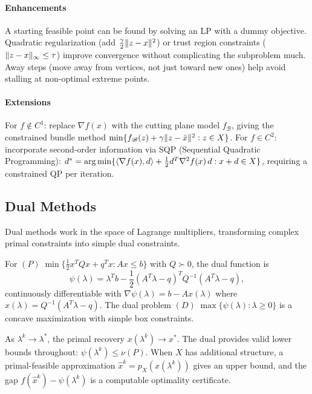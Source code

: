 \paragraph{Enhancements}

A starting feasible point can be found by solving an LP with a dummy objective.
Quadratic regularization (add $\frac{\gamma}{2}\lVert z - x\rVert^2$) or trust region constraints ($\lVert z - x\rVert_\infty \leq \tau$) improve convergence without complicating the subproblem much.
Away steps (move away from vertices, not just toward new ones) help avoid stalling at non-optimal extreme points.

\paragraph{Extensions}

For $f \notin C^1$: replace $\nabla f(x)$ with the cutting plane model $f_{\mathcal{B}}$, giving the constrained bundle method $\min\{f_{\mathcal{B}}(z) + \gamma\lVert z - \bar{x}\rVert^2 : z \in X\}$.
For $f \in C^2$: incorporate second-order information via SQP (Sequential Quadratic Programming): $d^* = \operatorname*{arg\,min}\{\langle\nabla f(x), d\rangle + \frac{1}{2} d^T \nabla^2 f(x)\, d : x + d \in X\}$, requiring a constrained QP per iteration.


\subsection{Dual Methods}\label{ssec:dual-methods}

Dual methods work in the space of Lagrange multipliers, transforming complex primal constraints into simple dual constraints.

For $(P)\; \min\{\frac{1}{2} x^T Q x + q^T x : Ax \leq b\}$ with $Q \succ 0$, the dual function is
\begin{equation}\label{eq:dual-function-qp}
	\psi(\lambda) = \lambda^T b - \frac{1}{2}(A^T\lambda - q)^T Q^{-1}(A^T\lambda - q),
\end{equation}
continuously differentiable with $\nabla\psi(\lambda) = b - Ax(\lambda)$ where $x(\lambda) = Q^{-1}(A^T\lambda - q)$.
The dual problem $(D)\; \max\{\psi(\lambda) : \lambda \geq 0\}$ is a concave maximization with simple box constraints.

As $\lambda^k \to \lambda^*$, the primal recovery $x(\lambda^k) \to x^*$.
The dual provides valid lower bounds throughout: $\psi(\lambda^k) \leq \nu(P)$.
When $X$ has additional structure, a primal-feasible approximation $\hat{x}^k = p_X(x(\lambda^k))$ gives an upper bound, and the gap $f(\hat{x}^k) - \psi(\lambda^k)$ is a computable optimality certificate.

